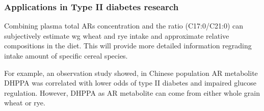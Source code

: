 \begin{table}[h!]
	\caption{Biomarkers of Wheat Intake Reported in Observation study}
	\label{table:wheat_observation}
\end{table}

\subsubsection{Applications in Type II diabetes research}
Combining plasma total ARs concentration and the ratio (C17:0/C21:0) can subjectively estimate \acrshort{wg} wheat and rye intake and approximate relative compositions in the diet. This will provide more detailed information regrading intake amount of specific cereal species.

For example, an observation study showed, in Chinese population AR metabolite DHPPA was correlated with lower odds of type II diabetes and impaired glucose regulation\cite{ISI:000430455900021}. However, DHPPA as AR metabolite can come from either whole grain wheat or rye.

